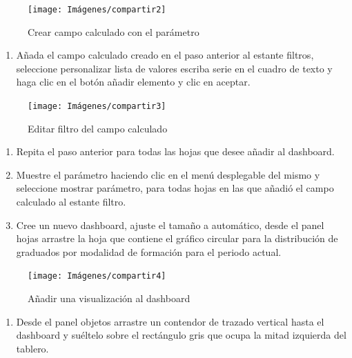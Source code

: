 \documentclass[
]{book}
\providecommand{\tightlist}{%
  \setlength{\itemsep}{0pt}\setlength{\parskip}{0pt}}
\begin{document}
\begin{figure}

{\centering \texttt{[image: Imágenes/compartir2]} 

}

\caption{Crear campo calculado con el parámetro}\label{fig:paso3tablero-fig}
\end{figure}

\begin{enumerate}
\def\labelenumi{\arabic{enumi}.}
\setcounter{enumi}{3}
\tightlist
\item
  Añada el campo calculado creado en el paso anterior al estante filtros, seleccione personalizar lista de valores escriba serie en el cuadro de texto y haga clic en el botón añadir elemento y clic en aceptar.
\end{enumerate}

\begin{figure}

{\centering \texttt{[image: Imágenes/compartir3]} 

}

\caption{Editar filtro del campo calculado}\label{fig:paso4tablero-fig}
\end{figure}

\begin{enumerate}
\def\labelenumi{\arabic{enumi}.}
\setcounter{enumi}{4}
\item
  Repita el paso anterior para todas las hojas que desee añadir al dashboard.
\item
  Muestre el parámetro haciendo clic en el menú desplegable del mismo y seleccione mostrar parámetro, para todas hojas en las que añadió el campo calculado al estante filtro.
\item
  Cree un nuevo dashboard, ajuste el tamaño a automático, desde el panel hojas arrastre la hoja que contiene el gráfico circular para la distribución de graduados por modalidad de formación para el periodo actual.
\end{enumerate}

\begin{figure}

{\centering \texttt{[image: Imágenes/compartir4]} 

}

\caption{Añadir una visualización al dashboard}\label{fig:paso7tablero-fig}
\end{figure}

\begin{enumerate}
\def\labelenumi{\arabic{enumi}.}
\setcounter{enumi}{7}
\tightlist
\item
  Desde el panel objetos arrastre un contendor de trazado vertical hasta el dashboard y suéltelo sobre el rectángulo gris que ocupa la mitad izquierda del tablero.
\end{enumerate}
\end{document}
